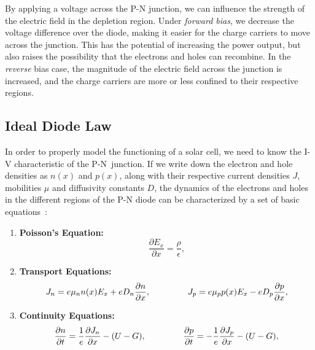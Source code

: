\begin{refsection}
By applying a voltage across the P-N junction, we can influence the strength 
of the electric field in the depletion region. Under \textit{forward bias}, we 
decrease the voltage difference over the diode, making it easier for the 
charge carriers to move across the junction. This has the potential of 
increasing the power output, but also raises the possibility that the 
electrons and holes can recombine. In the \textit{reverse} bias case, the 
magnitude of the electric field across the junction is increased, and the charge carriers are 
more or less confined to their respective regions.  
 
\subsection{Ideal Diode Law} 
 
In order to properly model the functioning of a solar cell, we need to know 
the I-V characteristic of the P-N~junction. If we write down the electron and 
hole densities as $n(x)$ and $p(x)$, along with their respective current 
densities $J$, mobilities $\mu$ and diffusivity constants $D$, the dynamics of 
the electrons and holes in the different regions of the P-N diode can be 
characterized by a set of basic equations~\cite{Shockley1949}: 
\vspace{0.1in} 
\begin{enumerate} 

\item \textbf{Poisson's Equation: } \begin{equation}\frac{\partial 
E_x}{\partial x} = \frac{\rho}{\epsilon},\end{equation} 
 
\item \textbf{Transport Equations: } \begin{equation}J_n = e \mu_n n(x) E_x + 
e D_n\frac{\partial n }{\partial x}, \hspace{0.6in} J_p = e \mu_p p(x) E_x - e 
D_p \frac{\partial p}{\partial x},\end{equation} 
 
\item \textbf{Continuity Equations: } \begin{equation}\frac{\partial 
n}{\partial t} = \frac{1}{e} \frac{\partial J_n}{\partial x} - (U - G), 
\hspace{0.6in} \frac{\partial p}{\partial t} = - \frac{1}{e} \frac{\partial 
J_p}{\partial x} - (U - G),\end{equation} 


\end{enumerate}
\end{refsection}
